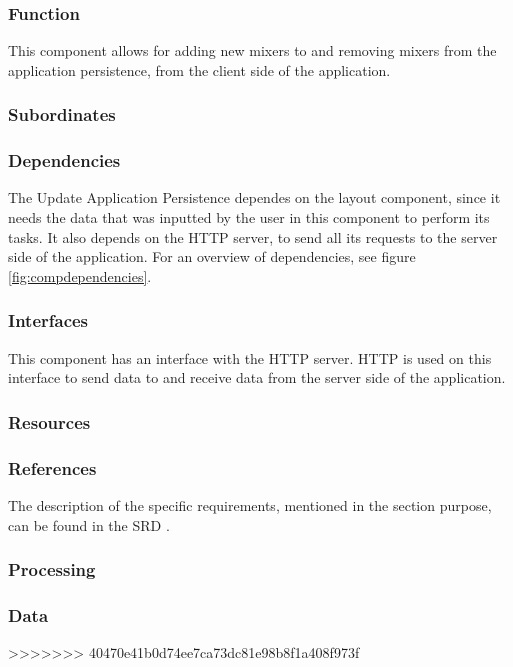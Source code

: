 \subsubsection*{Function}
This component allows for adding new mixers to and removing mixers from the application persistence, from the client side of the application.

\subsubsection*{Subordinates}

\subsubsection*{Dependencies}
The Update Application Persistence dependes on the layout component, since it needs the data that was inputted by the user in this component to perform its tasks. It also depends on the HTTP server, to send all its requests to the server side of the application. For an overview of dependencies, see figure \ref{fig:compdependencies}.

\subsubsection*{Interfaces}
This component has an interface with the HTTP server. HTTP is used on this interface to send data to and receive data from the server side of the application. 

\subsubsection*{Resources}

\subsubsection*{References}
The description of the specific requirements, mentioned in the section purpose, can be found in the SRD \cite{srd}.

\subsubsection*{Processing}

\subsubsection*{Data}
>>>>>>> 40470e41b0d74ee7ca73dc81e98b8f1a408f973f
